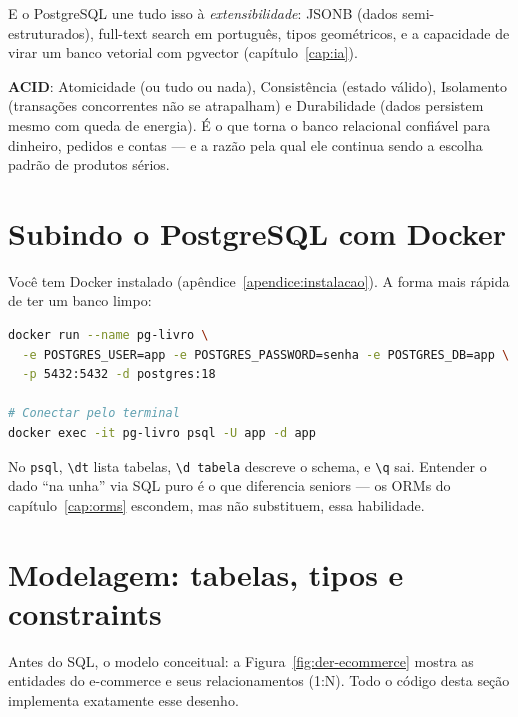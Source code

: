 E o PostgreSQL une tudo isso à \emph{extensibilidade}: JSONB (dados
semi-estruturados), full-text search em português, tipos geométricos, e a
capacidade de virar um banco vetorial com pgvector (capítulo~\ref{cap:ia}).

\begin{caixaconceito}
\textbf{ACID}: Atomicidade (ou tudo ou nada), Consistência (estado válido),
Isolamento (transações concorrentes não se atrapalham) e Durabilidade (dados
persistem mesmo com queda de energia). É o que torna o banco relacional
confiável para dinheiro, pedidos e contas — e a razão pela qual ele continua
sendo a escolha padrão de produtos sérios.
\end{caixaconceito}

\section{Subindo o PostgreSQL com Docker}

Você tem Docker instalado (apêndice~\ref{apendice:instalacao}). A forma mais
rápida de ter um banco limpo:

\begin{lstlisting}[style=livro, language=Bash,
  caption={Subindo o PostgreSQL 18 em contêiner.}, label={list:pg-docker}]
docker run --name pg-livro \
  -e POSTGRES_USER=app -e POSTGRES_PASSWORD=senha -e POSTGRES_DB=app \
  -p 5432:5432 -d postgres:18

# Conectar pelo terminal
docker exec -it pg-livro psql -U app -d app
\end{lstlisting}

\begin{caixadica}
No \texttt{psql}, \texttt{\textbackslash dt} lista tabelas, \texttt{\textbackslash d tabela}
descreve o schema, e \texttt{\textbackslash q} sai. Entender o dado ``na unha''
via SQL puro é o que diferencia seniors — os ORMs do capítulo~\ref{cap:orms}
escondem, mas não substituem, essa habilidade.
\end{caixadica}

\section{Modelagem: tabelas, tipos e constraints}

Antes do SQL, o modelo conceitual: a Figura~\ref{fig:der-ecommerce} mostra as
entidades do e-commerce e seus relacionamentos (1:N). Todo o código desta
seção implementa exatamente esse desenho.

